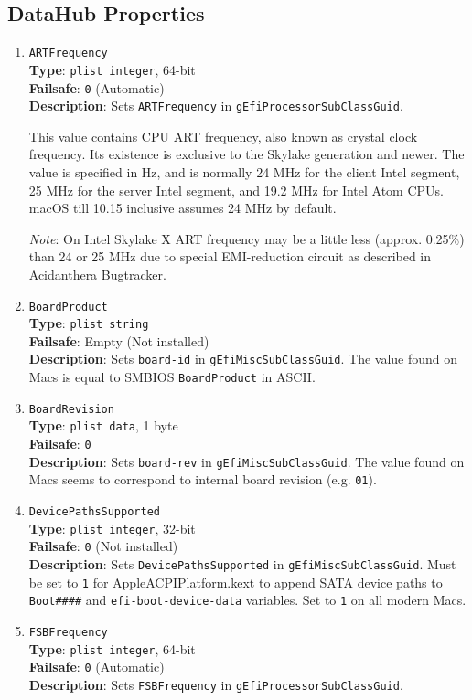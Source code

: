 \documentclass[]{article}
\makeatletter
\renewcommand{\label}[1]{%
\zref@wrapper@immediate{\oldlabel{#1}}}  %
\makeatother
\begin{document}
\subsection{DataHub Properties}\label{platforminfodatahub}

\begin{enumerate}

\item
  \texttt{ARTFrequency}\\
  \textbf{Type}: \texttt{plist\ integer}, 64-bit\\
  \textbf{Failsafe}: \texttt{0} (Automatic)\\
  \textbf{Description}: Sets \texttt{ARTFrequency} in
  \texttt{gEfiProcessorSubClassGuid}.

  This value contains CPU ART frequency, also known as crystal clock frequency.
  Its existence is exclusive to the Skylake generation and newer. The value is specified
  in Hz, and is normally 24 MHz for the client Intel segment, 25 MHz for the server Intel segment,
  and 19.2 MHz for Intel Atom CPUs. macOS till 10.15 inclusive assumes 24 MHz by default.

  \emph{Note}: On Intel Skylake X ART frequency may be a little less (approx. 0.25\%) than
  24 or 25 MHz due to special EMI-reduction circuit as described in
  \href{https://github.com/acidanthera/bugtracker/issues/448#issuecomment-524914166}{Acidanthera Bugtracker}.
\item
  \texttt{BoardProduct}\\
  \textbf{Type}: \texttt{plist\ string}\\
  \textbf{Failsafe}: Empty (Not installed)\\
  \textbf{Description}: Sets \texttt{board-id} in
  \texttt{gEfiMiscSubClassGuid}. The value found on Macs is equal to SMBIOS
  \texttt{BoardProduct} in ASCII.
\item
  \texttt{BoardRevision}\\
  \textbf{Type}: \texttt{plist\ data}, 1 byte\\
  \textbf{Failsafe}: \texttt{0}\\
  \textbf{Description}: Sets \texttt{board-rev} in
  \texttt{gEfiMiscSubClassGuid}. The value found on Macs seems to correspond
  to internal board revision (e.g. \texttt{01}).
\item
  \texttt{DevicePathsSupported}\\
  \textbf{Type}: \texttt{plist\ integer}, 32-bit\\
  \textbf{Failsafe}: \texttt{0} (Not installed)\\
  \textbf{Description}: Sets \texttt{DevicePathsSupported} in
  \texttt{gEfiMiscSubClassGuid}. Must be set to \texttt{1} for
  AppleACPIPlatform.kext to append SATA device paths to
  \texttt{Boot\#\#\#\#} and \texttt{efi-boot-device-data} variables.
  Set to \texttt{1} on all modern Macs.
\item
  \texttt{FSBFrequency}\\
  \textbf{Type}: \texttt{plist\ integer}, 64-bit\\
  \textbf{Failsafe}: \texttt{0} (Automatic)\\
  \textbf{Description}: Sets \texttt{FSBFrequency} in
  \texttt{gEfiProcessorSubClassGuid}.


\end{enumerate}
\end{document}
